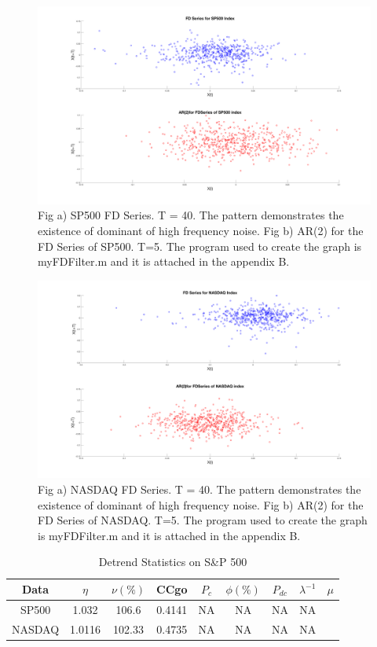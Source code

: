 \begin{figure}[!ht]
\includegraphics[scale=.15]{Images/FDAR2SP500}
\caption{Fig a) SP500 FD Series. T = 40. The pattern demonstrates the existence of dominant of high frequency noise. Fig b) AR(2) for the FD Series of SP500. T=5. The program used to create the graph is myFDFilter.m and it is attached in the appendix B.}
\label{fig:FDAR2SP500}
\end{figure}


\begin{figure}[!ht]
\includegraphics[scale=.15]{Images/FDAR2NASDAQ}
\caption{Fig a) NASDAQ FD Series. T = 40. The pattern demonstrates the existence of dominant of high frequency noise. Fig b) AR(2) for the FD Series of NASDAQ. T=5. The program used to create the graph is myFDFilter.m and it is attached in the appendix B.}
\label{fig:FDAR2NASDAQ}
\end{figure}

\begin{table}[h!]
\centering
\begin{tabular}{||c c c c c c c c c||}
 \hline
  Data & $\eta$ & $\nu(\%)$ & CCgo & $P_{c}$  & $\phi (\%)$ & $P_{dc}$ & $\lambda^{-1}$ &$\mu$ \\ [0.5ex]
   \hline\hline
    SP500 & 1.032 & 106.6 & 0.4141 & NA & NA & NA & NA\\
	 NASDAQ & 1.0116 & 102.33 & 0.4735 & NA & NA & NA & NA \\
	   \hline
	   \end{tabular}
	   \caption{Detrend Statistics on S\&P 500 }
	   \label{table:dectrendstat}
	   \end{table}
